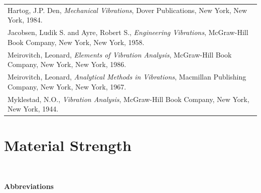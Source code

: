 \documentclass[
]{book}
\begin{document}
\begin{longtable}[]{@{}l@{}}
\toprule
\endhead
\begin{minipage}[t]{0.97\columnwidth}\raggedright
Hartog, J.P. Den, \emph{Mechanical Vibrations}, Dover Publications, New York, New York, 1984.\strut
\end{minipage}\tabularnewline
\begin{minipage}[t]{0.97\columnwidth}\raggedright
Jacobsen, Ludik S. and Ayre, Robert S., \emph{Engineering Vibrations}, McGraw-Hill Book Company, New York, New York, 1958.\strut
\end{minipage}\tabularnewline
\begin{minipage}[t]{0.97\columnwidth}\raggedright
Meirovitch, Leonard, \emph{Elements of Vibration Analysis}, McGraw-Hill Book Company, New York, New York, 1986.\strut
\end{minipage}\tabularnewline
\begin{minipage}[t]{0.97\columnwidth}\raggedright
Meirovitch, Leonard, \emph{Analytical Methods in Vibrations}, Macmillan Publishing Company, New York, New York, 1967.\strut
\end{minipage}\tabularnewline
\begin{minipage}[t]{0.97\columnwidth}\raggedright
Myklestad, N.O., \emph{Vibration Analysis}, McGraw-Hill Book Company, New York, New York, 1944.\strut
\end{minipage}\tabularnewline
\bottomrule
\end{longtable}

\hypertarget{material-strength}{%
\chapter{Material Strength}\label{material-strength}}

~

\textbf{Abbreviations}
\end{document}
